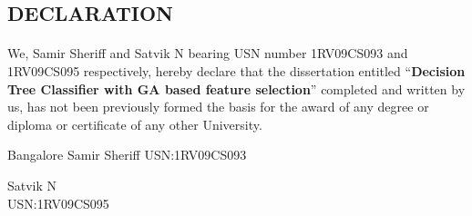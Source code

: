 \documentclass[12pt]{report}
\begin{document}
\begin{titlepage}
\begin{center}
\section*{DECLARATION}
\end{center}

\paragraph{}  We, Samir Sheriff and Satvik N bearing USN number 1RV09CS093 and 1RV09CS095 respectively, hereby declare that the dissertation entitled ``\textbf{Decision Tree Classifier with GA based feature selection}'' completed and written by us, has not been previously formed the basis for the award of any degree or diploma or certificate of any other University.
\vspace{1in}

\begin{flushright} {Bangalore \hspace{4.4in} Samir Sheriff } 
 {USN:1RV09CS093}
 \end{flushright}

\begin{flushright} { Satvik N } \\
 {USN:1RV09CS095}
 \end{flushright}
\end{titlepage}
\end{document}
